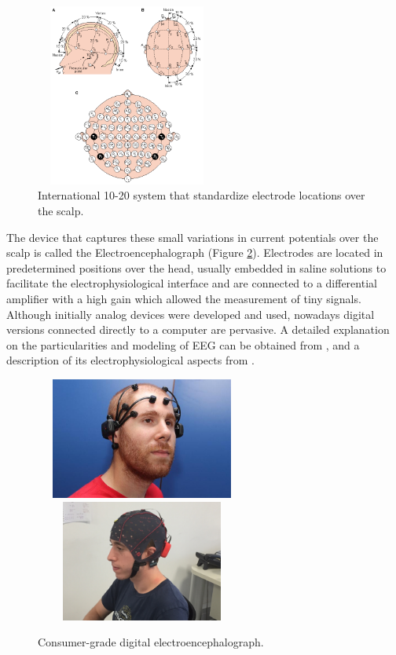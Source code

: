 \begin{figure}[]
\centering
\includegraphics[height=6cm,width=6cm]{images/ElectrodePositions1020.png}
\caption[Electrode Locations]{International 10-20 system that standardize electrode locations over the scalp.}
\label{fig:electrodelocations}
\end{figure}


The device that captures these small variations in current potentials over the scalp is called the Electroencephalograph (Figure \ref{fig:digitalelectroencephalograph}).  Electrodes are located in predetermined positions over the head, usually embedded in saline solutions to facilitate the electrophysiological interface and are connected to a differential amplifier with a high gain which allowed the measurement of tiny signals. Although initially analog devices were developed and used, nowadays digital versions connected directly to a computer are pervasive.  A detailed explanation on the particularities and modeling of EEG can be obtained from \cite{Jackson2014}, and a description of its electrophysiological aspects from \cite{Haberman2012}.

\begin{figure}[]
\centering
\includegraphics[height=4cm,width=7cm]{images/emotivsubject.jpg}
\includegraphics[height=4cm,width=7cm]{images/gTecsubject.jpg}
\caption[Wearable portable Digital Electroencephalograph]{Consumer-grade digital electroencephalograph.}
\label{fig:digitalelectroencephalograph}
\end{figure}


